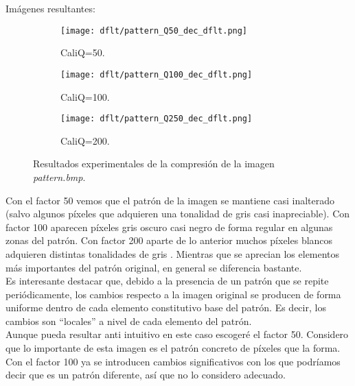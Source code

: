 \documentclass[12pt,a4paper]{article}
\begin{document}
Imágenes resultantes:
\begin{figure}[H]

    \begin{subfigure}{0.30\textwidth}
        \centering
        \texttt{[image: dflt/pattern\_Q50\_dec\_dflt.png]}
        \caption{CaliQ=50.}
        
    \end{subfigure}
    \hfill
    \begin{subfigure}{0.30\textwidth}
        \centering
        \texttt{[image: dflt/pattern\_Q100\_dec\_dflt.png]}
        \caption{CaliQ=100.}
        
    \end{subfigure}
    \hfill
    \begin{subfigure}{0.30\textwidth}
        \centering
        \texttt{[image: dflt/pattern\_Q250\_dec\_dflt.png]}
        \caption{CaliQ=200.}
        
    \end{subfigure}
    
    \caption[Resultados experimentales - pattern]{Resultados experimentales de la compresión de la imagen \textit{pattern.bmp}.}
    
\end{figure}

Con el factor 50 vemos que el patrón de la imagen se mantiene casi inalterado (salvo algunos píxeles que adquieren una tonalidad de gris casi inapreciable). Con factor 100 aparecen píxeles gris oscuro casi negro de forma regular en algunas zonas del patrón. Con factor 200 aparte de lo anterior muchos píxeles blancos adquieren distintas tonalidades de gris . Mientras que se aprecian los elementos más importantes del patrón original, en general se diferencia bastante.\\

Es interesante destacar que, debido a la presencia de un patrón que se repite periódicamente, los cambios respecto a la imagen original se producen de forma uniforme dentro de cada elemento constitutivo base del patrón. Es decir, los cambios son ``locales'' a nivel de cada elemento del patrón.\\

Aunque pueda resultar anti intuitivo en este caso escogeré el factor 50. Considero que lo importante de esta imagen es el patrón concreto de píxeles que la forma. Con el factor 100 ya se introducen cambios significativos con los que podríamos decir que es un patrón diferente, así que no lo considero adecuado. \\
\end{document}
